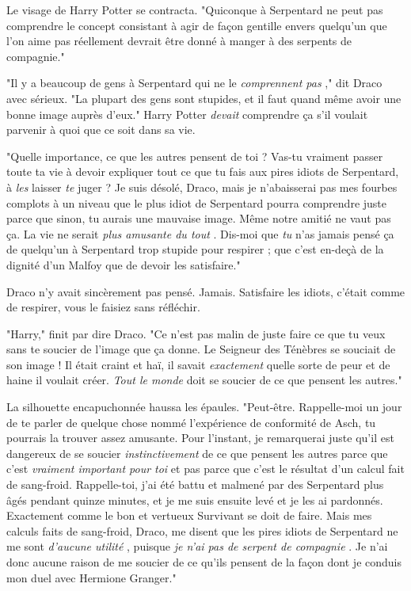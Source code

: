 Le visage de Harry Potter se contracta. "Quiconque à Serpentard ne peut pas comprendre le concept consistant à agir de façon gentille envers quelqu'un que l'on aime pas réellement devrait être donné à manger à des serpents de compagnie."

"Il y a beaucoup de gens à Serpentard qui ne le \emph{comprennent pas} ," dit Draco avec sérieux. "La plupart des gens sont stupides, et il faut quand même avoir une bonne image auprès d'eux." Harry Potter \emph{devait}  comprendre ça s'il voulait parvenir à quoi que ce soit dans sa vie.

"Quelle importance, ce que les autres pensent de toi ? Vas-tu vraiment passer toute ta vie à devoir expliquer tout ce que tu fais aux pires idiots de Serpentard, à \emph{les } laisser \emph{te}  juger ? Je suis désolé, Draco, mais je n'abaisserai pas mes fourbes complots à un niveau que le plus idiot de Serpentard pourra comprendre juste parce que sinon, tu aurais une mauvaise image. Même notre amitié ne vaut pas ça. La vie ne serait \emph{plus amusante du tout} . Dis-moi que \emph{tu}  n'as jamais pensé ça de quelqu'un à Serpentard trop stupide pour respirer ; que c'est en-deçà de la dignité d'un Malfoy que de devoir les satisfaire."

Draco n'y avait sincèrement pas pensé. Jamais. Satisfaire les idiots, c'était comme de respirer, vous le faisiez sans réfléchir.

"Harry," finit par dire Draco. "Ce n'est pas malin de juste faire ce que tu veux sans te soucier de l'image que ça donne. Le Seigneur des Ténèbres se souciait de son image ! Il était craint et haï, il savait \emph{exactement}  quelle sorte de peur et de haine il voulait créer. \emph{Tout le monde}  doit se soucier de ce que pensent les autres."

La silhouette encapuchonnée haussa les épaules. "Peut-être. Rappelle-moi un jour de te parler de quelque chose nommé l'expérience de conformité de Asch, tu pourrais la trouver assez amusante. Pour l'instant, je remarquerai juste qu'il est dangereux de se soucier \emph{instinctivement}  de ce que pensent les autres parce que c'est \emph{vraiment important pour toi}  et pas parce que c'est le résultat d'un calcul fait de sang-froid. Rappelle-toi, j'ai été battu et malmené par des Serpentard plus âgés pendant quinze minutes, et je me suis ensuite levé et je les ai pardonnés. Exactement comme le bon et vertueux Survivant se doit de faire. Mais mes calculs faits de sang-froid, Draco, me disent que les pires idiots de Serpentard ne me sont \emph{d'aucune utilité} , puisque \emph{je n'ai pas de serpent de compagnie} . Je n'ai donc aucune raison de me soucier de ce qu'ils pensent de la façon dont je conduis mon duel avec Hermione Granger."

